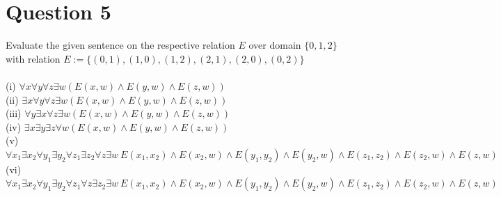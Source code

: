 \documentclass[12pt]{fphw}
\begin{document}
\section*{Question 5}

\begin{problem}
  Evaluate the given sentence on the respective relation $E$ over domain $\{0,1,2\}$ with relation $E := \{(0,1),(1,0),(1,2),(2,1),(2,0),(0,2)\}$\\ \\
  (i) $\forall x \forall y \forall z \exists w (E(x,w) \wedge E(y,w) \wedge E(z,w))$ \\
  (ii) $\exists x \forall y \forall z \exists w (E(x,w) \wedge E(y,w) \wedge E(z,w))$ \\
  (iii) $\forall y \exists x \forall z \exists w (E(x,w) \wedge E(y,w) \wedge E(z,w))$ \\
  (iv) $\exists x \exists y \exists z \forall w (E(x,w) \wedge E(y,w) \wedge E(z,w))$ \\
  (v) $\forall x_1 \exists x_2 \forall y_1 \exists y_2 \forall z_1 \exists z_2 \forall z \exists w \ E(x_1, x_2) \wedge E(x_2, w) \wedge E(y_1, y_2) \wedge E(y_2, w) \wedge E(z_1, z_2) \wedge E(z_2, w) \wedge E(z,w)$ \\
  (vi) $\forall x_1 \exists x_2 \forall y_1 \exists y_2 \forall z_1 \forall z \exists z_2 \exists w \ E(x_1, x_2) \wedge E(x_2, w) \wedge E(y_1, y_2) \wedge E(y_2, w) \wedge E(z_1, z_2) \wedge E(z_2, w) \wedge E(z,w)$
\end{problem}
\end{document}
